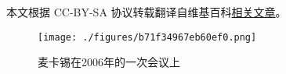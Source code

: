 
本文根据 CC-BY-SA 协议转载翻译自维基百科\href{https://en.wikipedia.org/wiki/Maxwell\%27s_equations}{相关文章}。

\begin{figure}[ht]
\centering
\texttt{[image: ./figures/b71f34967eb60ef0.png]}
\caption{麦卡锡在2006年的一次会议上} \label{fig_YHMKX_1}
\end{figure}